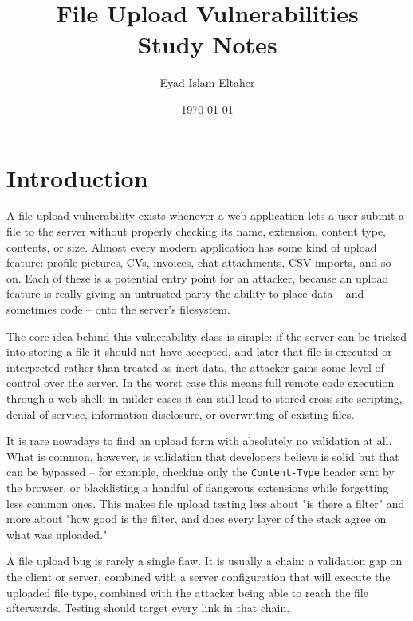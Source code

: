 \documentclass[11pt]{article}
\title{\vspace{-2cm}\textbf{\Huge File Upload Vulnerabilities}\\[0.4em]\Large Study Notes}
\author{\Large Eyad Islam Eltaher}
\date{\today}
\begin{document}
\maketitle
\thispagestyle{empty}

 
\newpage
\tableofcontents
\newpage

\section{Introduction}

A file upload vulnerability exists whenever a web application lets a user submit a file to the server without properly checking its name, extension, content type, contents, or size. Almost every modern application has some kind of upload feature: profile pictures, CVs, invoices, chat attachments, CSV imports, and so on. Each of these is a potential entry point for an attacker, because an upload feature is really giving an untrusted party the ability to place data -- and sometimes code -- onto the server's filesystem.

The core idea behind this vulnerability class is simple: if the server can be tricked into storing a file it should not have accepted, and later that file is executed or interpreted rather than treated as inert data, the attacker gains some level of control over the server. In the worst case this means full remote code execution through a web shell; in milder cases it can still lead to stored cross-site scripting, denial of service, information disclosure, or overwriting of existing files.

It is rare nowadays to find an upload form with absolutely no validation at all. What is common, however, is validation that developers believe is solid but that can be bypassed -- for example, checking only the \texttt{Content-Type} header sent by the browser, or blacklisting a handful of dangerous extensions while forgetting less common ones. This makes file upload testing less about "is there a filter" and more about "how good is the filter, and does every layer of the stack agree on what was uploaded."

\begin{note}
A file upload bug is rarely a single flaw. It is usually a chain: a validation gap on the client or server, combined with a server configuration that will execute the uploaded file type, combined with the attacker being able to reach the file afterwards. Testing should target every link in that chain.
\end{note}
\end{document}
